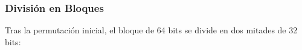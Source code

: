 




\subsubsection{División en Bloques}
Tras la permutación inicial, el bloque de 64 bits se divide en dos mitades de 32 bits:







